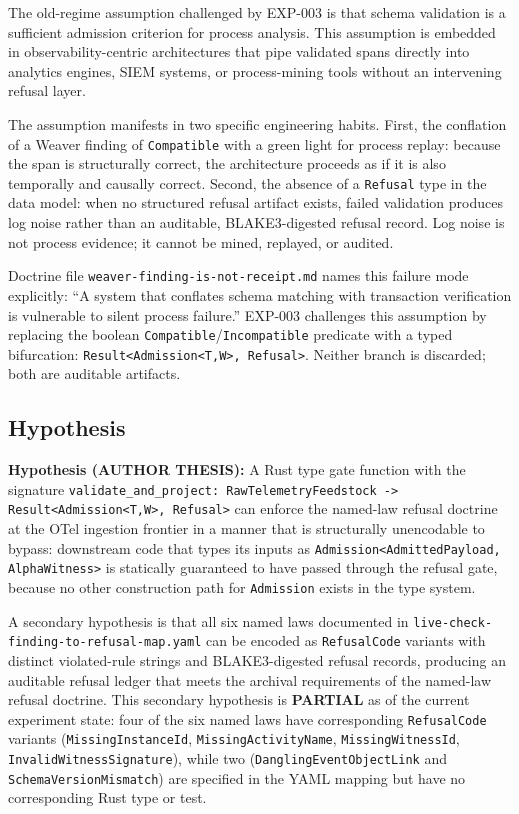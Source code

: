 The old-regime assumption challenged by EXP-003 is that schema validation is a
sufficient admission criterion for process analysis. This assumption is embedded in
observability-centric architectures that pipe validated spans directly into analytics
engines, SIEM systems, or process-mining tools without an intervening refusal layer.

The assumption manifests in two specific engineering habits. First, the conflation of
a Weaver finding of \texttt{Compatible} with a green light for process replay: because
the span is structurally correct, the architecture proceeds as if it is also temporally
and causally correct. Second, the absence of a \texttt{Refusal} type in the data
model: when no structured refusal artifact exists, failed validation produces log noise
rather than an auditable, BLAKE3-digested refusal record. Log noise is not process
evidence; it cannot be mined, replayed, or audited.

Doctrine file \texttt{weaver-finding-is-not-receipt.md} names this failure mode
explicitly: ``A system that conflates schema matching with transaction verification
is vulnerable to silent process failure.'' EXP-003 challenges this assumption by
replacing the boolean \texttt{Compatible}/\texttt{Incompatible} predicate with a
typed bifurcation: \texttt{Result<Admission<T,W>, Refusal>}. Neither branch is
discarded; both are auditable artifacts.

\subsection{Hypothesis}
\label{sec:otel-weaver-exp-003-live-check-to-refusal-question-hypothesis}

\textbf{Hypothesis (AUTHOR THESIS):} A Rust type gate function with the signature
\texttt{validate\_and\_project: RawTelemetryFeedstock -> Result<Admission<T,W>, Refusal>}
can enforce the named-law refusal doctrine at the OTel ingestion frontier in a manner
that is structurally unencodable to bypass: downstream code that types its inputs as
\texttt{Admission<AdmittedPayload, AlphaWitness>} is statically guaranteed to have
passed through the refusal gate, because no other construction path for
\texttt{Admission} exists in the type system.

A secondary hypothesis is that all six named laws documented in
\texttt{live-check-finding-to-refusal-map.yaml} can be encoded as \texttt{RefusalCode}
variants with distinct violated-rule strings and BLAKE3-digested refusal records,
producing an auditable refusal ledger that meets the archival requirements of the
named-law refusal doctrine. This secondary hypothesis is \textbf{PARTIAL} as of the
current experiment state: four of the six named laws have corresponding
\texttt{RefusalCode} variants (\texttt{MissingInstanceId}, \texttt{MissingActivityName},
\texttt{MissingWitnessId}, \texttt{InvalidWitnessSignature}), while two
(\texttt{DanglingEventObjectLink} and \texttt{SchemaVersionMismatch}) are specified
in the YAML mapping but have no corresponding Rust type or test.


